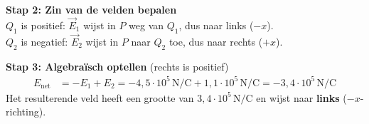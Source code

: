 \documentclass{ximera}
\begin{document}
\begin{exercise}
\begin{solution}
        \textbf{Stap 2: Zin van de velden bepalen}\\
        $Q_1$ is positief: $\vec{E}_1$ wijst in $P$ weg van $Q_1$, dus naar links ($-x$).\\
        $Q_2$ is negatief: $\vec{E}_2$ wijst in $P$ naar $Q_2$ toe, dus naar rechts ($+x$).

        \textbf{Stap 3: Algebraïsch optellen} (rechts is positief)
        \begin{align*}
            E_{\text{net}} &= -E_1 + E_2 = -4{,}5 \cdot 10^{5} \, \mathrm{N/C} + 1{,}1 \cdot 10^{5} \, \mathrm{N/C} = \boxed{-3{,}4 \cdot 10^{5} \, \mathrm{N/C}}
        \end{align*}
        Het resulterende veld heeft een grootte van $3{,}4 \cdot 10^{5} \, \mathrm{N/C}$ en wijst naar \textbf{links} ($-x$-richting).
    \end{solution}
\end{exercise}
\end{document}
